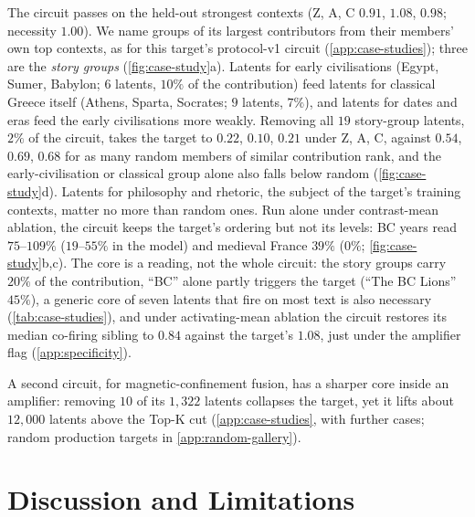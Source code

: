 \documentclass[10pt]{article}
\begin{document}
The circuit passes on the held-out strongest contexts (Z, A, C $0.91$, $1.08$, $0.98$; necessity $1.00$).
We name groups of its largest contributors from their members' own top contexts, as for this target's protocol-v1 circuit (\cref{app:case-studies}); three are the \emph{story groups} (\cref{fig:case-study}a).
Latents for early civilisations (Egypt, Sumer, Babylon; $6$ latents, $10\%$ of the contribution) feed latents for classical Greece itself (Athens, Sparta, Socrates; $9$ latents, $7\%$), and latents for dates and eras feed the early civilisations more weakly.
Removing all $19$ story-group latents, $2\%$ of the circuit, takes the target to $0.22$, $0.10$, $0.21$ under Z, A, C, against $0.54$, $0.69$, $0.68$ for as many random members of similar contribution rank, and the early-civilisation or classical group alone also falls below random (\cref{fig:case-study}d).
Latents for philosophy and rhetoric, the subject of the target's training contexts, matter no more than random ones.
Run alone under contrast-mean ablation, the circuit keeps the target's ordering but not its levels: BC years read $75$--$109\%$ ($19$--$55\%$ in the model) and medieval France $39\%$ ($0\%$; \cref{fig:case-study}b,c).
The core is a reading, not the whole circuit: the story groups carry $20\%$ of the contribution, ``BC'' alone partly triggers the target (``The BC Lions'' $45\%$), a generic core of seven latents that fire on most text is also necessary (\cref{tab:case-studies}), and under activating-mean ablation the circuit restores its median co-firing sibling to $0.84$ against the target's $1.08$, just under the amplifier flag (\cref{app:specificity}).

A second circuit, for magnetic-confinement fusion, has a sharper core inside an amplifier: removing $10$ of its $1{,}322$ latents collapses the target, yet it lifts about $12{,}000$ latents above the Top-K cut (\cref{app:case-studies}, with further cases; random production targets in \cref{app:random-gallery}).

\section{Discussion and Limitations}
\label{sec:discussion}
\end{document}
